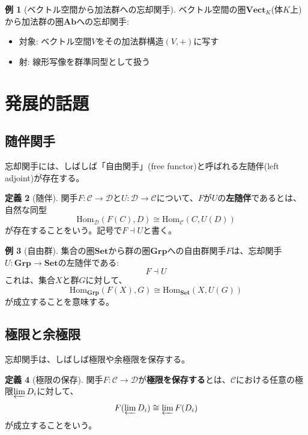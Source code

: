 \documentclass[a4paper,12pt]{article}
\theoremstyle{definition}
\newtheorem{definition}{定義}[section]
\newtheorem{example}[definition]{例}
\begin{document}
\begin{example}[ベクトル空間から加法群への忘却関手]
ベクトル空間の圏$\mathbf{Vect}_K$(体$K$上)から加法群の圏$\mathbf{Ab}$への忘却関手:
\begin{itemize}
\item 対象: ベクトル空間$V$をその加法群構造$(V, +)$に写す
\item 射: 線形写像を群準同型として扱う
\end{itemize}
\end{example}

\section{発展的話題}

\subsection{随伴関手}

忘却関手には、しばしば「自由関手」(free functor)と呼ばれる左随伴(left adjoint)が存在する。

\begin{definition}[随伴]\label{def:adjunction}
関手$F : \mathcal{C} \to \mathcal{D}$と$U : \mathcal{D} \to \mathcal{C}$について、$F$が$U$の\textbf{左随伴}であるとは、自然な同型
\[
\text{Hom}_{\mathcal{D}}(F(C), D) \cong \text{Hom}_{\mathcal{C}}(C, U(D))
\]
が存在することをいう。記号で$F \dashv U$と書く。
\end{definition}

\begin{example}[自由群]
集合の圏$\mathbf{Set}$から群の圏$\mathbf{Grp}$への自由群関手$F$は、忘却関手$U : \mathbf{Grp} \to \mathbf{Set}$の左随伴である:
\[
F \dashv U
\]
これは、集合$X$と群$G$に対して、
\[
\text{Hom}_{\mathbf{Grp}}(F(X), G) \cong \text{Hom}_{\mathbf{Set}}(X, U(G))
\]
が成立することを意味する。
\end{example}

\subsection{極限と余極限}

忘却関手は、しばしば極限や余極限を保存する。

\begin{definition}[極限の保存]
関手$F : \mathcal{C} \to \mathcal{D}$が\textbf{極限を保存する}とは、$\mathcal{C}$における任意の極限$\varprojlim D_i$に対して、
\[
F(\varprojlim D_i) \cong \varprojlim F(D_i)
\]
が成立することをいう。
\end{definition}
\end{document}
